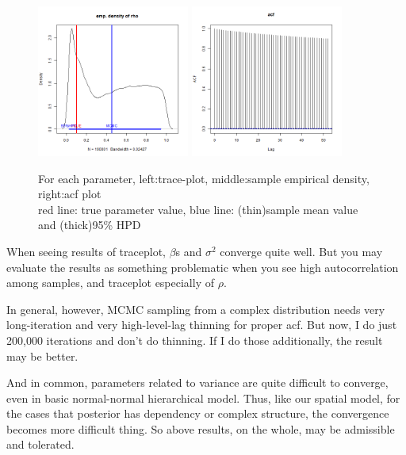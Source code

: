 \documentclass{article}
\begin{document}
\begin{figure}[h]
    \includegraphics[width=5cm]{prob3_rho_density.png} 
    \includegraphics[width=5cm]{prob3_rho_acf.png} \\
    \caption{For each parameter, left:trace-plot, middle:sample empirical density, right:acf plot\\
    red line: true parameter value, blue line: (thin)sample mean value and (thick)95\% HPD}

\end{figure}
\clearpage

When seeing results of traceplot, $\beta$s and $\sigma^2$ converge quite well.
But you may evaluate the results as something problematic when you see 
high autocorrelation among samples, and traceplot especially of $\rho$.

In general, however, MCMC sampling from a complex distribution needs very long-iteration and
very high-level-lag thinning for proper acf. But now, I do just 200,000 iterations and don't do thinning.
If I do those additionally, the result may be better.

And in common, parameters related to variance are quite difficult to converge,
even in basic normal-normal hierarchical model. 
Thus, like our spatial model, for the cases that posterior has dependency 
or complex structure, the convergence becomes more difficult thing.
So above results, on the whole, may be admissible and tolerated.
\end{document}
